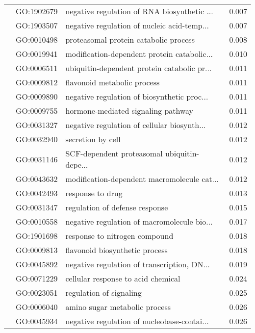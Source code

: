 \begin{longtable}{lllr}
   & GO:1902679 &  negative regulation of RNA biosynthetic ... &         0.007 \\
   & GO:1903507 &  negative regulation of nucleic acid-temp... &         0.007 \\
   & GO:0010498 &        proteasomal protein catabolic process &         0.008 \\
   & GO:0019941 &  modification-dependent protein catabolic... &         0.010 \\
   & GO:0006511 &  ubiquitin-dependent protein catabolic pr... &         0.011 \\
   & GO:0009812 &                  flavonoid metabolic process &         0.011 \\
   & GO:0009890 &  negative regulation of biosynthetic proc... &         0.011 \\
   & GO:0009755 &           hormone-mediated signaling pathway &         0.011 \\
   & GO:0031327 &  negative regulation of cellular biosynth... &         0.012 \\
   & GO:0032940 &                            secretion by cell &         0.012 \\
   & GO:0031146 &  SCF-dependent proteasomal ubiquitin-depe... &         0.012 \\
   & GO:0043632 &  modification-dependent macromolecule cat... &         0.012 \\
   & GO:0042493 &                             response to drug &         0.013 \\
   & GO:0031347 &               regulation of defense response &         0.015 \\
   & GO:0010558 &  negative regulation of macromolecule bio... &         0.017 \\
   & GO:1901698 &                response to nitrogen compound &         0.018 \\
   & GO:0009813 &               flavonoid biosynthetic process &         0.018 \\
   & GO:0045892 &  negative regulation of transcription, DN... &         0.019 \\
   & GO:0071229 &           cellular response to acid chemical &         0.024 \\
   & GO:0023051 &                      regulation of signaling &         0.025 \\
   & GO:0006040 &                amino sugar metabolic process &         0.026 \\
   & GO:0045934 &  negative regulation of nucleobase-contai... &         0.026 \\

\end{longtable}
